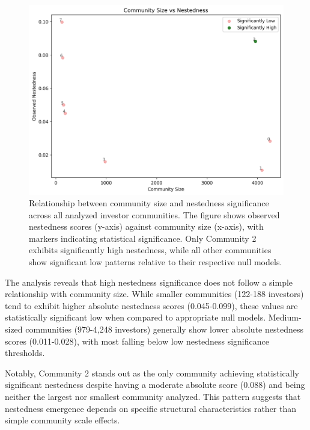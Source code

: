 \begin{figure}[htp]
\centering
\includegraphics[width=1\textwidth]{../figures/us/nestedness_by_community_size.png}
\caption{Relationship between community size and nestedness significance across all analyzed investor communities. The figure shows observed nestedness scores (y-axis) against community size (x-axis), with markers indicating statistical significance. Only Community 2 exhibits significantly high nestedness, while all other communities show significant low patterns relative to their respective null models.}
\label{fig:nestedness_by_community_size}
\end{figure}

The analysis reveals that high nestedness significance does not follow a simple relationship with community size. While smaller communities (122-188 investors) tend to exhibit higher absolute nestedness scores (0.045-0.099), these values are statistically significant low when compared to appropriate null models. Medium-sized communities (979-4,248 investors) generally show lower absolute nestedness scores (0.011-0.028), with most falling below low nestedness significance thresholds.

Notably, Community 2 stands out as the only community achieving statistically significant nestedness despite having a moderate absolute score (0.088) and being neither the largest nor smallest community analyzed. This pattern suggests that nestedness emergence depends on specific structural characteristics rather than simple community scale effects.

\newcommand{\interestingCommunity}{2}
\newcommand{\interestingCommunityNODF}{0.088}
\newcommand{\interestingCommunityPValue}{0.00001}

